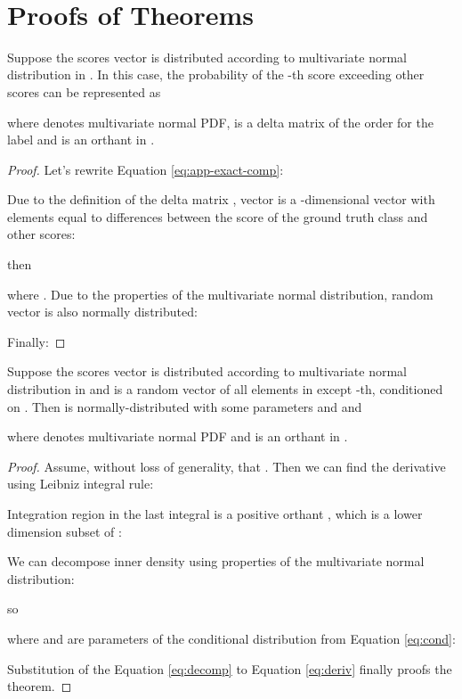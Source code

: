 \documentclass[nohyperref]{article}
\theoremstyle{plain}
\theoremstyle{definition}
\theoremstyle{remark}
\begin{document}




\newpage
~
\newpage

\theoremstyle{plain}
\newtheorem{manualtheoreminner}{Theorem}
\newenvironment{manualtheorem}[1]{\renewcommand\themanualtheoreminner{#1}\manualtheoreminner
}{\endmanualtheoreminner}

\appendix
\section{Proofs of Theorems}
\begin{manualtheorem}{4.2}
Suppose the scores vector  is distributed according to multivariate normal distribution  in . In this case, the probability of the -th score exceeding other scores can be represented as

where  denotes multivariate normal PDF,  is a delta matrix of the order  for the label  and  is an orthant in .
\end{manualtheorem}
\begin{proof}
Let's rewrite Equation \ref{eq:app-exact-comp}:

Due to the definition of the delta matrix , vector  is a -dimensional vector with elements equal to differences between the score of the ground truth class  and other scores:

then

where . Due to the properties of the multivariate normal distribution, random vector  is also normally distributed:

Finally:

\end{proof}

\newpage
\begin{manualtheorem}{4.3}
\label{theor:app-grad}
Suppose the scores vector  is distributed according to multivariate normal distribution  in  and  is a random vector of all elements in  except -th, conditioned on . Then  is normally-distributed with some parameters  and  and

where  denotes multivariate normal PDF and  is an orthant in .
\end{manualtheorem}
\begin{proof}

Assume, without loss of generality, that . Then we can find the derivative using Leibniz integral rule:

Integration region in the last integral is a positive orthant , which is a lower dimension subset of :

We can decompose inner density using properties of the multivariate normal distribution:

so

where  and  are parameters of the conditional distribution from Equation \ref{eq:cond}:

Substitution of the Equation \ref{eq:decomp} to Equation \ref{eq:deriv} finally proofs the theorem.
\end{proof}
\end{document}
